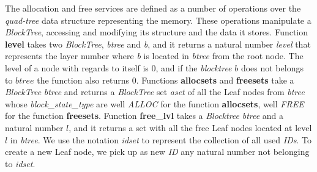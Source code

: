 The allocation and free services are defined as a number of operations over the \emph{quad-tree} data structure representing the memory. These operations manipulate a \textsl{BlockTree}, accessing and modifying its structure and the data it stores. Function \textbf{level} takes two \emph{BlockTree}, \emph{btree} and \emph{b}, and it returns a natural number \emph{level} that represents the layer number where \emph{b} is located in \emph{btree} from the root node. The level of a node with regards to itself is $0$, and if the \emph{blocktree} $b$ does not belongs to $btree$ the function also returns $0$. Functions \textbf{allocsets} and \textbf{freesets} take a \emph{BlockTree} \emph{btree} and returns a \emph{BlockTree} set \emph{aset} of all the Leaf nodes from \emph{btree} whose \emph{block\_state\_type} are well \emph{ALLOC} for the function \textbf{allocsets}, well \emph{FREE} for the function \textbf{freesets}. Function \textbf{free\_lvl} takes a \emph{Blocktree} \emph{btree} and a natural number $l$, and it returns a set with all the free Leaf nodes located at level $l$ in \emph{btree}. We use the notation \emph{idset} to represent the collection of all used \emph{IDs}. To create a new Leaf node, we pick up as new \emph{ID} any natural number not belonging to \emph{idset}.


